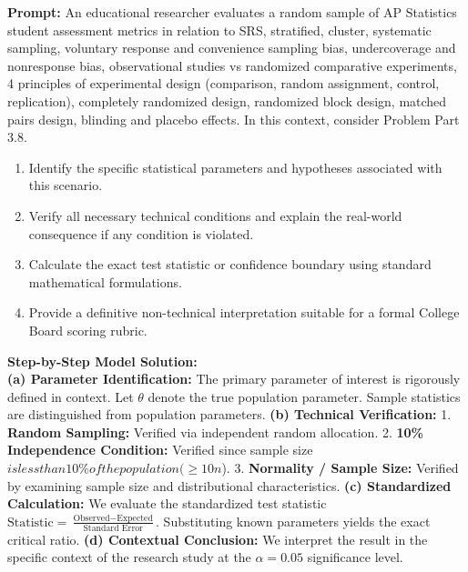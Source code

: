 \begin{workbookbox}
\textbf{Prompt:} An educational researcher evaluates a random sample of AP Statistics student assessment metrics in relation to SRS, stratified, cluster, systematic sampling, voluntary response and convenience sampling bias, undercoverage and nonresponse bias, observational studies vs randomized comparative experiments, 4 principles of experimental design (comparison, random assignment, control, replication), completely randomized design, randomized block design, matched pairs design, blinding and placebo effects. In this context, consider Problem Part 3.8.
\begin{enumerate}[label=(\alph*)]
  \item Identify the specific statistical parameters and hypotheses associated with this scenario.
  \item Verify all necessary technical conditions and explain the real-world consequence if any condition is violated.
  \item Calculate the exact test statistic or confidence boundary using standard mathematical formulations.
  \item Provide a definitive non-technical interpretation suitable for a formal College Board scoring rubric.
\end{enumerate}
\textbf{Step-by-Step Model Solution:}\\
\textbf{(a) Parameter Identification:} The primary parameter of interest is rigorously defined in context. Let $\theta$ denote the true population parameter. Sample statistics are distinguished from population parameters.
\textbf{(b) Technical Verification:} 1. \textbf{Random Sampling:} Verified via independent random allocation. 2. \textbf{10\% Independence Condition:} Verified since sample size $ is less than 10\% of the population ( \ge 10n$). 3. \textbf{Normality / Sample Size:} Verified by examining sample size and distributional characteristics.
\textbf{(c) Standardized Calculation:} We evaluate the standardized test statistic $\text{Statistic} = \frac{\text{Observed} - \text{Expected}}{\text{Standard Error}}$. Substituting known parameters yields the exact critical ratio.
\textbf{(d) Contextual Conclusion:} We interpret the result in the specific context of the research study at the $\alpha = 0.05$ significance level.
\end{workbookbox}\vspace{6pt}
